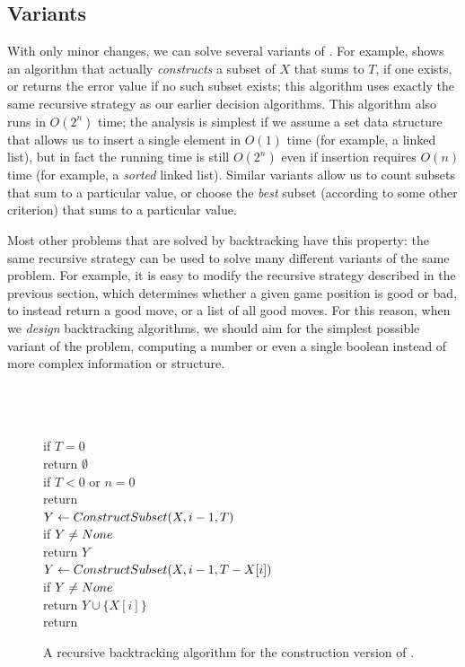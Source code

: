 \subsection{Variants}

With only minor changes, we can solve several variants of .
For example,  shows an algorithm that actually \textit{constructs} a subset of $X$ that sums to $T$, if one exists, or returns the error value  if no such subset exists; this algorithm uses exactly the same recursive strategy as our earlier decision algorithms.
This algorithm also runs in $O(2^n)$ time; the analysis is simplest if we assume a set data structure that allows us to insert a single element in $O(1)$ time (for example, a linked list), but in fact the running time is still $O(2^n)$ even if insertion requires $O(n)$ time (for example, a \textit{sorted} linked list).
Similar variants allow us to count subsets that sum to a particular value, or choose the \textit{best} subset (according to some other criterion) that sums to a particular value.

Most other problems that are solved by backtracking have this property: the same recursive strategy can be used to solve many different variants of the same problem.
For example, it is easy to modify the recursive strategy described in the previous section, which determines whether a given game position is good or bad, to instead return a good move, or a list of all good moves.
For this reason, when we \textit{design} backtracking algorithms, we should aim for the simplest possible variant of the problem, computing a number or even a single boolean instead of more complex information or structure.

\begin{figure}[ht]
\centering
\begin{pseudocode}
\\
\\
\\
if $T = 0$\\
\Indent return $\emptyset$\\
if $T < 0$ or $n = 0$\\
\Indent return \\
$Y \gets ConstructSubset(X, i-1, T)$\\
if $Y \neq None$\\
\Indent return $Y$\\
$Y \gets ConstructSubset(X, i-1, T - X[i])$\\
if $Y \neq None$\\
\Indent return $Y \cup \{X[i]\}$\\
return 
\end{pseudocode}
\caption{A recursive backtracking algorithm for the construction version of .}
\label{fig:2.6}
\end{figure}

